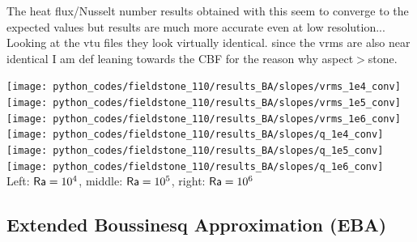 The heat flux/Nusselt number results obtained with this \stone seem to converge 
to the expected values but \aspect results are much more accurate even at low
resolution... 
Looking at the vtu files they look virtually identical. since the vrms are also 
near identical I am def leaning towards the CBF for the reason why aspect$>$stone.

\begin{center}
\texttt{[image: python\_codes/fieldstone\_110/results\_BA/slopes/vrms\_1e4\_conv]}
\texttt{[image: python\_codes/fieldstone\_110/results\_BA/slopes/vrms\_1e5\_conv]}
\texttt{[image: python\_codes/fieldstone\_110/results\_BA/slopes/vrms\_1e6\_conv]}\\
\texttt{[image: python\_codes/fieldstone\_110/results\_BA/slopes/q\_1e4\_conv]}
\texttt{[image: python\_codes/fieldstone\_110/results\_BA/slopes/q\_1e5\_conv]}
\texttt{[image: python\_codes/fieldstone\_110/results\_BA/slopes/q\_1e6\_conv]}\\
{\captionfont Left: ${\mathsf{Ra}}=10^4$, middle: ${\mathsf{Ra}}=10^5$, right: ${\mathsf{Ra}}=10^6$} 
\end{center}


\newpage
\subsection*{Extended Boussinesq Approximation (EBA)}

